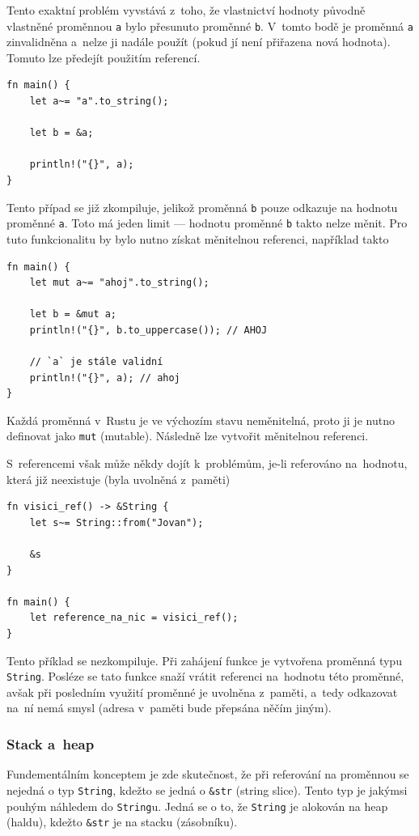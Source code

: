 \documentclass[a4paper, 12pt, twoside]{article} %
\newcommand{\rust}[1]{\texttt{#1}}
\begin{document}
				Tento exaktní problém vyvstává z~toho, že vlastnictví hodnoty původně vlastněné proměnnou \texttt{a} bylo přesunuto proměnné \texttt{b}. V~tomto bodě je proměnná \texttt{a} zinvalidněna a~nelze ji nadále použít (pokud jí není přiřazena nová hodnota). Tomuto lze předejít použitím referencí.
				\begin{verbatim}
fn main() {
	let a~= "a".to_string();
	
	let b = &a;
	
	println!("{}", a);
}
				\end{verbatim}
		
				Tento případ se již zkompiluje, jelikož proměnná \texttt{b} pouze odkazuje na hodnotu proměnné \texttt{a}. Toto má jeden limit — hodnotu proměnné \texttt{b} takto nelze měnit. Pro tuto funkcionalitu by bylo nutno získat měnitelnou referenci, například takto
				\begin{verbatim}
fn main() {
	let mut a~= "ahoj".to_string();
	
	let b = &mut a;
	println!("{}", b.to_uppercase()); // AHOJ

	// `a` je stále validní
	println!("{}", a); // ahoj
}
				\end{verbatim}
	
				Každá proměnná v~Rustu je ve výchozím stavu neměnitelná, proto ji je nutno definovat jako \texttt{mut} (mutable). Následně lze vytvořit měnitelnou referenci.
				
				S~referencemi však může někdy dojít k~problémům, je-li referováno na~hodnotu, která již neexistuje (byla uvolněná z~paměti)
				\begin{verbatim}
fn visici_ref() -> &String {
	let s~= String::from("Jovan");

	&s
}

fn main() {
	let reference_na_nic = visici_ref();
}
				\end{verbatim}
				\cite{dangle}
					
				Tento příklad se nezkompiluje. Při zahájení funkce je vytvořena proměnná typu \rust{String}. Posléze se tato funkce snaží vrátit referenci na~hodnotu této proměnné, avšak při posledním využití proměnné je uvolněna z~paměti, a~tedy odkazovat na~ní nemá smysl (adresa v~paměti bude přepsána něčím jiným).
			
			\subsubsection*{Stack a~heap}
				Fundementálním konceptem je zde skutečnost, že při referování na proměnnou se nejedná o typ \texttt{String}, kdežto se jedná o \texttt{\&str} (string slice). Tento typ je jakýmsi pouhým náhledem do \texttt{String}u. Jedná se o to, že \texttt{String} je alokován na heap (haldu), kdežto \texttt{\&str} je na stacku (zásobníku).
				
\end{document}
